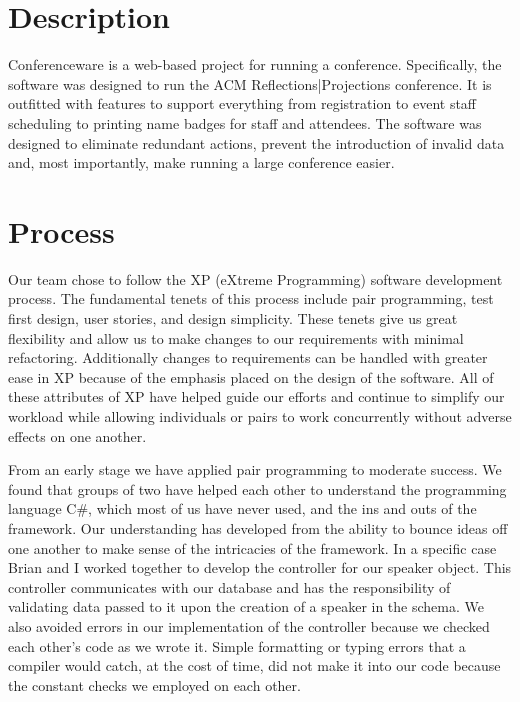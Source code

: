 \documentclass[12pt]{article}
\begin{document}
\renewcommand{\contentsname}{Table of Contents}
\tableofcontents
\newpage

\section{Description}
Conferenceware is a web-based project for running a conference. Specifically, the software was designed to run the ACM Reflections|Projections conference. It is outfitted with features to support everything from registration to event staff scheduling to printing name badges for staff and attendees.  The software was designed to eliminate redundant actions, prevent the introduction of invalid data and, most importantly, make running a large conference easier.

\newpage
\section{Process}

Our team chose to follow the XP (eXtreme Programming) software development process. The fundamental tenets of this process include pair programming, test first design, user stories, and design simplicity. These tenets give us great flexibility and allow us to make changes to our requirements with minimal refactoring. Additionally changes to requirements can be handled with greater ease in XP because of the emphasis placed on the design of the software. All of these attributes of XP have helped guide our efforts and continue to simplify our workload while allowing individuals or pairs to work concurrently without adverse effects on one another.

From an early stage we have applied pair programming to moderate success. We found that groups of two have helped each other to understand the programming language C\#, which most of us have never used, and the ins and outs of the framework. Our understanding has developed from the ability to bounce ideas off one another to make sense of the intricacies of the framework. In a specific case Brian and I worked together to develop the controller for our speaker object. This controller communicates with our database and has the responsibility of validating data passed to it upon the creation of a speaker in the schema. We also avoided errors in our implementation of the controller because we checked each other's code as we wrote it. Simple formatting or typing errors that a compiler would catch, at the cost of time, did not make it into our code because the constant checks we employed on each other.
\end{document}
